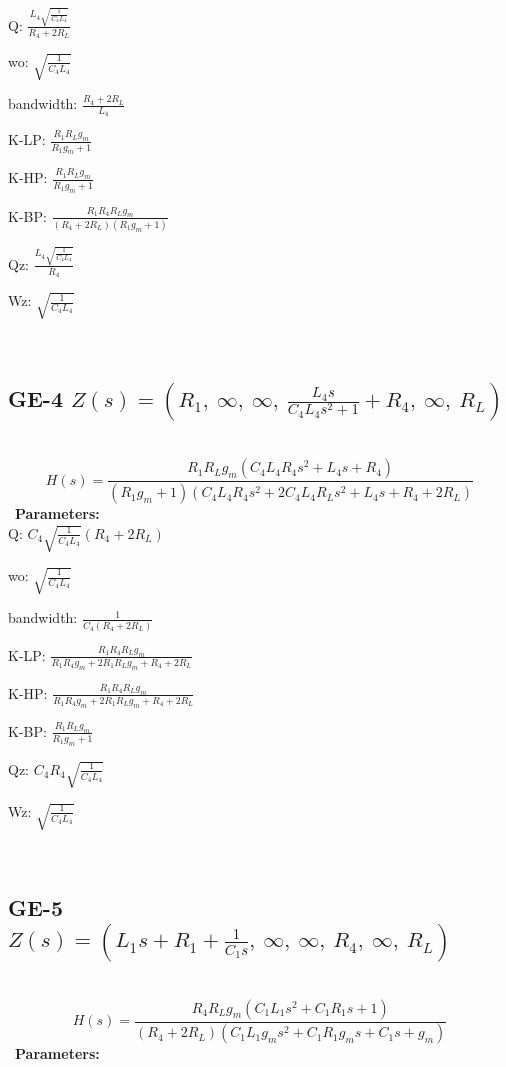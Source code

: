 \documentclass{article}
\begin{document}
Q: $\frac{L_{4} \sqrt{\frac{1}{C_{4} L_{4}}}}{R_{4} + 2 R_{L}}$\ 

wo: $\sqrt{\frac{1}{C_{4} L_{4}}}$\ 

bandwidth: $\frac{R_{4} + 2 R_{L}}{L_{4}}$\ 

K-LP: $\frac{R_{1} R_{L} g_{m}}{R_{1} g_{m} + 1}$\ 

K-HP: $\frac{R_{1} R_{L} g_{m}}{R_{1} g_{m} + 1}$\ 

K-BP: $\frac{R_{1} R_{4} R_{L} g_{m}}{\left(R_{4} + 2 R_{L}\right) \left(R_{1} g_{m} + 1\right)}$\ 

Qz: $\frac{L_{4} \sqrt{\frac{1}{C_{4} L_{4}}}}{R_{4}}$\ 

Wz: $\sqrt{\frac{1}{C_{4} L_{4}}}$\ 

\ 

\subsection{GE-4 $Z(s) = \left( R_{1}, \  \infty, \  \infty, \  \frac{L_{4} s}{C_{4} L_{4} s^{2} + 1} + R_{4}, \  \infty, \  R_{L}\right)$ } \ 
\textbf{\[H(s) = \frac{R_{1} R_{L} g_{m} \left(C_{4} L_{4} R_{4} s^{2} + L_{4} s + R_{4}\right)}{\left(R_{1} g_{m} + 1\right) \left(C_{4} L_{4} R_{4} s^{2} + 2 C_{4} L_{4} R_{L} s^{2} + L_{4} s + R_{4} + 2 R_{L}\right)}\] } \ 
\textbf{Parameters:}\\ 

Q: $C_{4} \sqrt{\frac{1}{C_{4} L_{4}}} \left(R_{4} + 2 R_{L}\right)$\ 

wo: $\sqrt{\frac{1}{C_{4} L_{4}}}$\ 

bandwidth: $\frac{1}{C_{4} \left(R_{4} + 2 R_{L}\right)}$\ 

K-LP: $\frac{R_{1} R_{4} R_{L} g_{m}}{R_{1} R_{4} g_{m} + 2 R_{1} R_{L} g_{m} + R_{4} + 2 R_{L}}$\ 

K-HP: $\frac{R_{1} R_{4} R_{L} g_{m}}{R_{1} R_{4} g_{m} + 2 R_{1} R_{L} g_{m} + R_{4} + 2 R_{L}}$\ 

K-BP: $\frac{R_{1} R_{L} g_{m}}{R_{1} g_{m} + 1}$\ 

Qz: $C_{4} R_{4} \sqrt{\frac{1}{C_{4} L_{4}}}$\ 

Wz: $\sqrt{\frac{1}{C_{4} L_{4}}}$\ 

\ 

\subsection{GE-5 $Z(s) = \left( L_{1} s + R_{1} + \frac{1}{C_{1} s}, \  \infty, \  \infty, \  R_{4}, \  \infty, \  R_{L}\right)$ } \ 
\textbf{\[H(s) = \frac{R_{4} R_{L} g_{m} \left(C_{1} L_{1} s^{2} + C_{1} R_{1} s + 1\right)}{\left(R_{4} + 2 R_{L}\right) \left(C_{1} L_{1} g_{m} s^{2} + C_{1} R_{1} g_{m} s + C_{1} s + g_{m}\right)}\] } \ 
\textbf{Parameters:}\\ 
\end{document}
